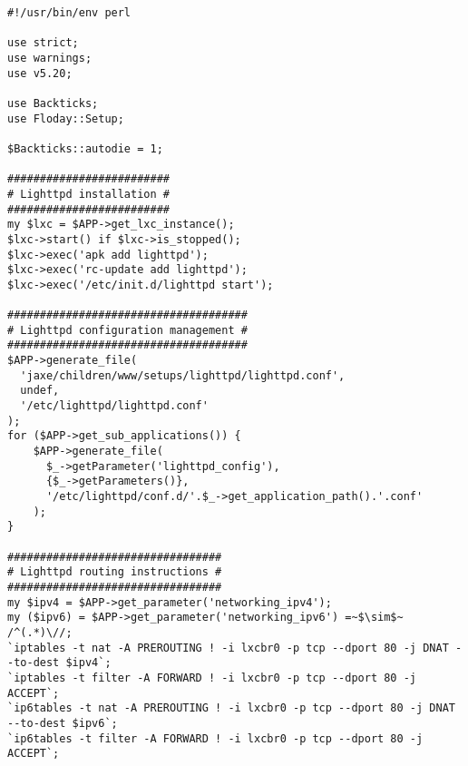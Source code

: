 \begin{lstlisting}[float=t, caption={Exemple de script de setup}, label=fig_1.3_setup]
#!/usr/bin/env perl

use strict;
use warnings;
use v5.20;

use Backticks;
use Floday::Setup;

$Backticks::autodie = 1;

#########################
# Lighttpd installation #
#########################
my $lxc = $APP->get_lxc_instance();
$lxc->start() if $lxc->is_stopped();
$lxc->exec('apk add lighttpd');
$lxc->exec('rc-update add lighttpd');
$lxc->exec('/etc/init.d/lighttpd start');

#####################################
# Lighttpd configuration management #
#####################################
$APP->generate_file(
  'jaxe/children/www/setups/lighttpd/lighttpd.conf',
  undef,
  '/etc/lighttpd/lighttpd.conf'
);
for ($APP->get_sub_applications()) {
	$APP->generate_file(
	  $_->getParameter('lighttpd_config'),
	  {$_->getParameters()},
	  '/etc/lighttpd/conf.d/'.$_->get_application_path().'.conf'
	);
}

#################################
# Lighttpd routing instructions #
#################################
my $ipv4 = $APP->get_parameter('networking_ipv4');
my ($ipv6) = $APP->get_parameter('networking_ipv6') =~$\sim$~ /^(.*)\//;
`iptables -t nat -A PREROUTING ! -i lxcbr0 -p tcp --dport 80 -j DNAT --to-dest $ipv4`;
`iptables -t filter -A FORWARD ! -i lxcbr0 -p tcp --dport 80 -j ACCEPT`;
`ip6tables -t nat -A PREROUTING ! -i lxcbr0 -p tcp --dport 80 -j DNAT --to-dest $ipv6`;
`ip6tables -t filter -A FORWARD ! -i lxcbr0 -p tcp --dport 80 -j ACCEPT`;
\end{lstlisting}
